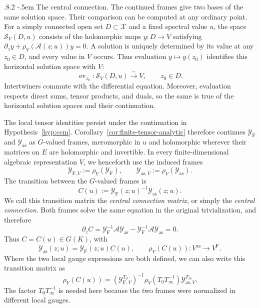 \documentclass[11pt,leqno]{amsart}
\makeatletter
\numberwithin{equation}{section}
\renewcommand\paragraph{\@startsection{paragraph}{4}{\z@}%
  {.8\baselineskip \@plus .2\baselineskip}%
  {-.5em}%
  {\normalfont\normalsize\bfseries}}
\theoremstyle{plain}
\theoremstyle{definition}
\theoremstyle{plain}
\theoremstyle{definition}
\theoremstyle{remark}
\makeatother
\begin{document}
\paragraph{The central connection.}
The continued frames give two bases of the same solution space.  Their comparison can be computed at any ordinary point.  For a simply connected open set $D\subset\mathscr X$ and a fixed spectral value $u$, the space $\mathscr S_V(D,u)$ consists of the holomorphic maps $y:D\to V$ satisfying $\partial_zy+\rho_V(\mathscr A(z;u))y=0$.  A solution is uniquely determined by its value at any $z_0\in D$, and every value in $V$ occurs.  Thus evaluation $y\mapsto y(z_0)$ identifies this horizontal solution space with $V$:
\begin{equation}\label{eq:sectorial-evaluation-isomorphism}
 \operatorname{ev}_{z_0}:\mathscr S_V(D,u)\xrightarrow{\sim}V,\qquad z_0\in D.
\end{equation}
Intertwiners commute with the differential equation.  Moreover, evaluation respects direct sums, tensor products, and duals, so the same is true of the horizontal solution spaces and their continuation.

The local tensor identities persist under the continuation in Hypothesis~\ref{hyp:ccm}.  Corollary~\ref{cor:finite-tensor-analytic} therefore continues $\mathcal Y_{\mathrm F}$ and $\mathcal Y_{\mathrm{as}}$ as $G$-valued frames, meromorphic in $u$ and holomorphic wherever their matrices on $E$ are holomorphic and invertible.  In every finite-dimensional algebraic representation $V$, we henceforth use the induced frames
\[
 \mathcal Y_{\mathrm F,V}:=\rho_V(\mathcal Y_{\mathrm F}),\qquad
 \mathcal Y_{\mathrm{as},V}:=\rho_V(\mathcal Y_{\mathrm{as}}).
\]
The transition between the $G$-valued frames is
\[
 C(u):=\mathcal Y_{\mathrm F}(z;u)^{-1}\mathcal Y_{\mathrm{as}}(z;u).
\]
We call this transition matrix the \emph{central connection matrix}, or simply the \emph{central connection}.  Both frames solve the same equation in the original trivialization, and therefore
\[
 \partial_zC=\mathcal Y_{\mathrm F}^{-1}\mathscr A\mathcal Y_{\mathrm{as}}
             -\mathcal Y_{\mathrm F}^{-1}\mathscr A\mathcal Y_{\mathrm{as}}=0.
\]
Thus $C=C(u)\in G(K)$, with
\begin{equation}\label{eq:group-frame-central-ratio}
 \mathcal Y_{\mathrm{as}}(z;u)=\mathcal Y_{\mathrm F}(z;u)C(u),\qquad
 \rho_V(C(u)):V^{\mathrm{as}}\longrightarrow V^{\mathrm F}.
\end{equation}
Where the two local gauge expressions are both defined, we can also write this transition matrix as
\begin{equation}\label{eq:central-local-gauge-transition}
 \rho_V(C(u))=(\mathcal Y_{\mathrm F,V}^{T_0})^{-1}
       \rho_V(T_0T_\infty^{-1})\mathcal Y_{\mathrm{as},V}^{T_\infty}.
\end{equation}
The factor $T_0T_\infty^{-1}$ is needed here because the two frames were normalized in different local gauges.
\end{document}

